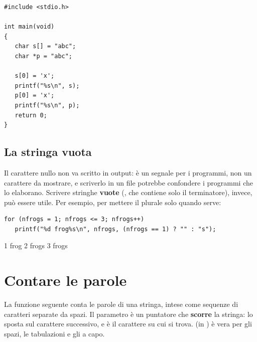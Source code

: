 \begin{affianco}[0.5][c]
\begin{lstlisting}[style=c, name=modifica.c]
#include <stdio.h>

int main(void)
{
   char s[] = "abc";
   char *p = "abc";

   s[0] = 'x';
   printf("%s\n", s);
   p[0] = 'x';
   printf("%s\n", p);
   return 0;
}
\end{lstlisting}
\risultato
{}
\end{affianco}

\subsection{La stringa vuota}

Il carattere nullo non va scritto in output: è un segnale per i programmi,
non un carattere da mostrare, e scriverlo in un file potrebbe confondere i
programmi che lo elaborano. Scrivere stringhe \textbf{vuote} (, che
contiene solo il terminatore), invece, può essere utile. Per esempio, per
mettere il plurale solo quando serve:

\begin{affianco}[0.6][c]
\begin{lstlisting}[style=c]
for (nfrogs = 1; nfrogs <= 3; nfrogs++)
   printf("%d frog%s\n", nfrogs, (nfrogs == 1) ? "" : "s");
\end{lstlisting}
\risultato
\begin{console}
1 frog
2 frogs
3 frogs
\end{console}
\end{affianco}

\section{Contare le parole}

La funzione seguente conta le parole di una stringa, intese come sequenze di
caratteri separate da spazi. Il parametro  è un puntatore che
\textbf{scorre} la stringa:  lo sposta sul carattere successivo, e
 è il carattere su cui si trova.  (in )
è vera per gli spazi, le tabulazioni e gli a capo.

